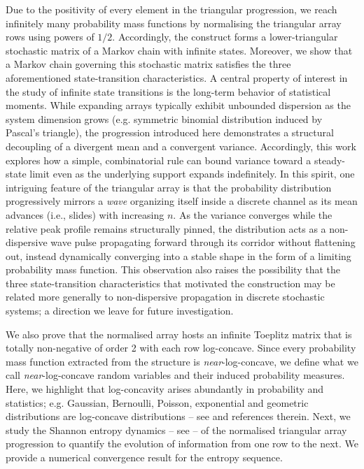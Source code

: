 \documentclass[a4paper,12pt]{article}
\begin{document}
Due to the positivity of every element in the triangular progression, we reach infinitely many probability mass functions by normalising the triangular array rows using powers of $1/2$. Accordingly, the construct forms a lower-triangular stochastic matrix of a Markov chain with infinite states. Moreover, we show that a Markov chain governing this stochastic matrix satisfies the three aforementioned state-transition characteristics. A central property of interest in the study of infinite state transitions is the long-term behavior of statistical moments. While expanding arrays typically exhibit unbounded dispersion as the system dimension grows (e.g. symmetric binomial distribution induced by Pascal's triangle), the progression introduced here demonstrates a structural decoupling of a divergent mean and a convergent variance. Accordingly, this work explores how a simple, combinatorial rule can bound variance toward a steady-state limit even as the underlying support expands indefinitely. In this spirit, one intriguing feature of the triangular array is that the probability distribution progressively mirrors a \emph{wave} organizing itself inside a discrete channel as its mean advances (i.e., slides) with increasing $n$. As the variance converges while the relative peak profile remains structurally pinned, the distribution acts as a non-dispersive wave pulse propagating forward through its corridor without flattening out, instead dynamically converging into a stable shape in the form of a limiting probability mass function. This observation also raises the possibility that the three state-transition characteristics that motivated the construction may be related more generally to non-dispersive propagation in discrete stochastic systems; a direction we leave for future investigation.

We also prove that the normalised array hosts an infinite Toeplitz matrix that is totally non-negative of order 2 with each row log-concave. Since every probability mass function extracted from the structure is \emph{near}-log-concave, we define what we call \emph{near}-log-concave random variables and their induced probability measures. Here, we highlight that log-concavity arises abundantly in probability and statistics; e.g. Gaussian, Bernoulli, Poisson, exponential and geometric distributions are log-concave distributions -- see \cite{0b,0aaa,1,6a,6aa,9aaa,13} and references therein. Next, we study the Shannon entropy dynamics -- see \cite{0,0a,2a,5a,7a} -- of the normalised triangular array progression to quantify the evolution of information from one row to the next. We provide a numerical convergence result for the entropy sequence. 
\end{document}
